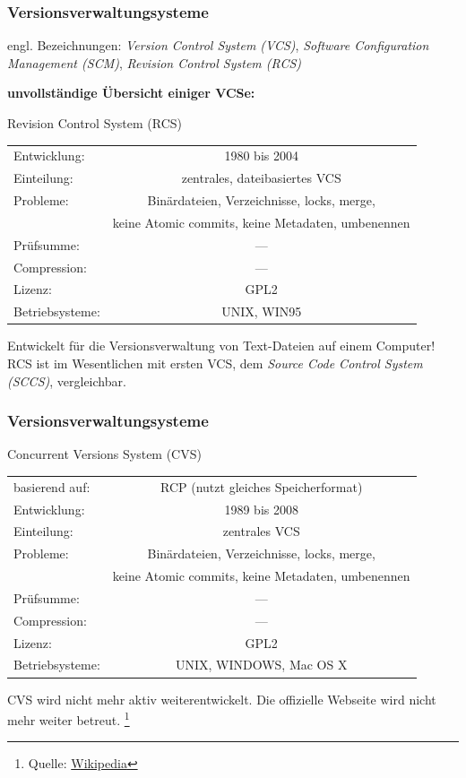 \documentclass{beamer}
\begin{document}
\begin{frame}\frametitle{Versionsverwaltungsysteme} 

engl. Bezeichnungen: \textit{Version Control System (VCS)}, \textit{Software Configuration Management (SCM)}, \textit{Revision Control System (RCS)}

\vspace*{0.15cm}
\textbf{unvollständige Übersicht einiger VCSe:}
\begin{block}{Revision Control System (RCS)}
	\begin{tabular}{l c}
Entwicklung: & 1980 bis 2004  \\  
Einteilung: & zentrales, dateibasiertes VCS \\ 
Probleme: & Binärdateien, Verzeichnisse, locks, merge, \\
          & keine Atomic commits, keine Metadaten, umbenennen  \\
Prüfsumme: & --- \\
Compression: & --- \\
Lizenz: & GPL2 \\
Betriebsysteme: & UNIX, WIN95 \\

\end{tabular} 

\vspace*{0.3cm}
Entwickelt für die Versionsverwaltung von Text-Dateien auf einem Computer!
RCS ist im Wesentlichen mit ersten VCS, dem \textit{Source Code Control System (SCCS)}, vergleichbar.
\end{block}


\end{frame}

\begin{frame}\frametitle{Versionsverwaltungsysteme} 

\begin{block}{Concurrent Versions System (CVS)}
	\begin{tabular}{l c}
basierend auf: & RCP (nutzt gleiches Speicherformat) \\ 
Entwicklung: & 1989 bis 2008  \\  
Einteilung: & zentrales VCS \\ 
Probleme: & Binärdateien, Verzeichnisse, locks, merge, \\
          & keine Atomic commits, keine Metadaten, umbenennen  \\
Prüfsumme: & --- \\
Compression: & --- \\
Lizenz: & GPL2 \\
Betriebsysteme: & UNIX, WINDOWS, Mac OS X \\
\end{tabular} 

\vspace*{0.3cm}
CVS wird nicht mehr aktiv weiterentwickelt. Die offizielle Webseite wird nicht mehr weiter betreut. \footnote{Quelle: \href{http://de.wikipedia.org/wiki/Concurrent_Versions_System}{Wikipedia}}
\end{block}


\end{frame}
\end{document}
